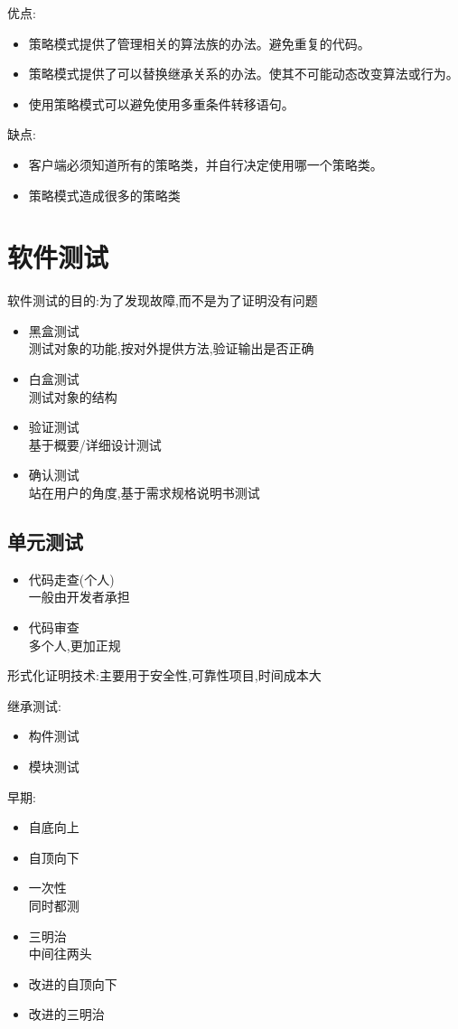 \documentclass[UTF8,a4paper]{ctexart}
\begin{document}
优点:
\begin{itemize}
  \item 策略模式提供了管理相关的算法族的办法。避免重复的代码。
 \item 策略模式提供了可以替换继承关系的办法。使其不可能动态改变算法或行为。
 \item 使用策略模式可以避免使用多重条件转移语句。
\end{itemize}

缺点:
\begin{itemize}
  \item 客户端必须知道所有的策略类，并自行决定使用哪一个策略类。
 \item 策略模式造成很多的策略类
\end{itemize}

\section{软件测试}

软件测试的目的:为了发现故障,而不是为了证明没有问题

\begin{itemize}
  \item 黑盒测试\\
  测试对象的功能,按对外提供方法,验证输出是否正确
  \item 白盒测试\\
  测试对象的结构
  \item 验证测试\\
  基于概要/详细设计测试
  \item 确认测试\\
  站在用户的角度,基于需求规格说明书测试
\end{itemize}

\subsection{单元测试}
\begin{itemize}
  \item 代码走查(个人)\\
  一般由开发者承担
  \item 代码审查\\
  多个人,更加正规
\end{itemize}

形式化证明技术:主要用于安全性,可靠性项目,时间成本大

继承测试:
\begin{itemize}
  \item 构件测试
  \item 模块测试
\end{itemize}
早期:
\begin{itemize}
  \item 自底向上
  \item 自顶向下
  \item 一次性\\
  同时都测
  \item 三明治\\
  中间往两头
  \item 改进的自顶向下
  \item 改进的三明治
\end{itemize}
\end{document}
